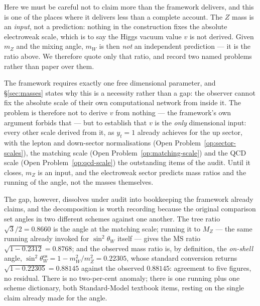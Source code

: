 Here we must be careful not to claim more than the framework delivers, and this is one of the places
where it delivers less than a complete account. The $Z$ mass is an \emph{input}, not a prediction:
nothing in the construction fixes the absolute electroweak scale, which is to say the Higgs vacuum
value $v$ is not derived. Given $m_Z$ and the mixing angle, $m_W$ is then \emph{not} an independent
prediction --- it is the ratio above. We therefore quote only that ratio, and record two named
problems rather than paper over them.

\begin{openproblem}\label{op:vev}
The framework requires exactly one free dimensional parameter, and \S\ref{sec:masses} states why
this is a necessity rather than a gap: the observer cannot fix the absolute scale of their own
computational network from inside it. The problem is therefore not to derive $v$ from nothing ---
the framework's own argument forbids that --- but to establish that $v$ is the \emph{only}
dimensional input: every other scale derived from it, as $y_t = 1$ already achieves for the up
sector, with the lepton and down-sector normalisations (Open Problem~\ref{op:sector-scales}), the
matching scale (Open Problem~\ref{op:matching-scale}) and the QCD scale
(Open Problem~\ref{op:qcd-scale}) the outstanding items of the audit. Until it closes, $m_Z$ is an
input, and the electroweak sector predicts mass ratios and the running of the angle, not the masses
themselves.
\end{openproblem}

The gap, however, dissolves under audit into bookkeeping the framework already claims, and the
decomposition is worth recording because the original comparison set angles in two different
schemes against one another. The tree ratio $\sqrt3/2 = 0.8660$ is the angle at the matching
scale; running it to $M_Z$ --- the same running already invoked for $\sin^2\theta_W$ itself ---
gives the $\overline{\mathrm{MS}}$ ratio $\sqrt{1 - 0.2312} = 0.8768$; and the observed mass
ratio is, by definition, the \emph{on-shell} angle,
$\sin^2\theta_W^{\mathrm{os}} = 1 - m_W^2/m_Z^2 = 0.22305$, whose standard conversion returns
$\sqrt{1 - 0.22305} = 0.88145$ against the observed $0.88145$: agreement to five figures, no
residual. There is no two-per-cent anomaly; there is one running plus one scheme dictionary, both
Standard-Model textbook items, resting on the single claim already made for the angle.

